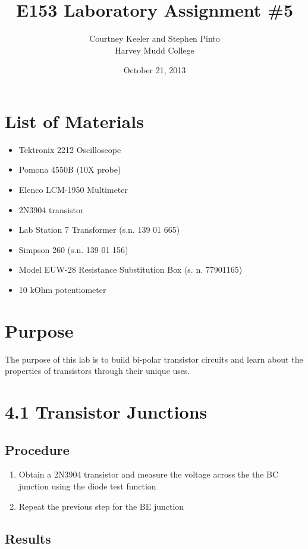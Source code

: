 \documentclass[12pt,letterpaper]{report}
\begin{document}
\title{E153 Laboratory Assignment \#5}
\author{Courtney Keeler and Stephen Pinto\\
Harvey Mudd College}
\date{October 21, 2013}
\maketitle

\section*{List of Materials}
\begin{itemize}
	\item Tektronix 2212 Oscilloscope
	\item Pomona 4550B (10X probe)
	\item Elenco LCM-1950 Multimeter
	\item 2N3904 transistor
	\item Lab Station 7 Transformer (s.n. 139 01 665)
	\item Simpson 260 (s.n. 139 01 156)
	\item Model EUW-28 Resistance Substitution Box (s. n. 77901165)
	\item 10 kOhm potentiometer
\end{itemize}

\section*{Purpose}
The purpose of this lab is to build bi-polar transistor circuits and learn about the properties of transistors through their unique uses.

\section*{4.1 Transistor Junctions}
\subsection*{Procedure}

\begin{enumerate}
\item Obtain a 2N3904 transistor and measure the voltage across the the BC junction using the diode test function
\item Repeat the previous step for the BE junction
\end{enumerate}

\subsection*{Results}
\end{document}
